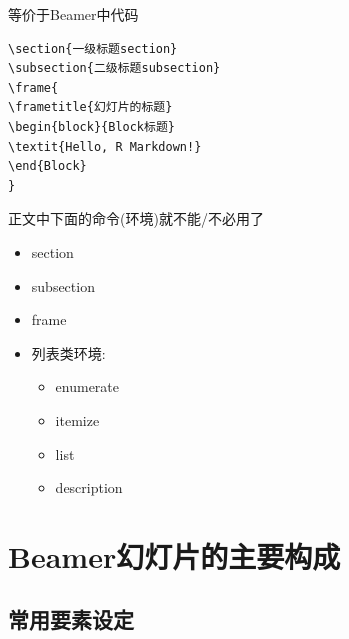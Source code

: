 \documentclass[
  12pt,
  ignorenonframetext,
  aspectratio=169, 12pt,table,t,utf-8]{beamer}
\providecommand{\tightlist}{%
  \setlength{\itemsep}{0pt}\setlength{\parskip}{0pt}}
\begin{document}
\begin{frame}[fragile]{等价于Beamer中代码}
\protect\hypertarget{ux7b49ux4ef7ux4e8ebeamerux4e2dux4ee3ux7801}{}
\begin{verbatim}
\section{一级标题section}
\subsection{二级标题subsection}
\frame{
\frametitle{幻灯片的标题}
\begin{block}{Block标题}
\textit{Hello, R Markdown!}
\end{Block}
}
\end{verbatim}
\end{frame}

\begin{frame}{正文中下面的命令(环境)就不能/不必用了}
\protect\hypertarget{ux6b63ux6587ux4e2dux4e0bux9762ux7684ux547dux4ee4ux73afux5883ux5c31ux4e0dux80fdux4e0dux5fc5ux7528ux4e86}{}
\begin{itemize}
\tightlist
\item
  section
\item
  subsection
\item
  frame
\item
  列表类环境:

  \begin{itemize}
  \tightlist
  \item
    enumerate
  \item
    itemize
  \item
    list
  \item
    description
  \end{itemize}
\end{itemize}
\end{frame}

\hypertarget{beamerux5e7bux706fux7247ux7684ux4e3bux8981ux6784ux6210}{%
\section{Beamer幻灯片的主要构成}\label{beamerux5e7bux706fux7247ux7684ux4e3bux8981ux6784ux6210}}

\hypertarget{ux5e38ux7528ux8981ux7d20ux8bbeux5b9a}{%
\subsection{常用要素设定}\label{ux5e38ux7528ux8981ux7d20ux8bbeux5b9a}}
\end{document}
